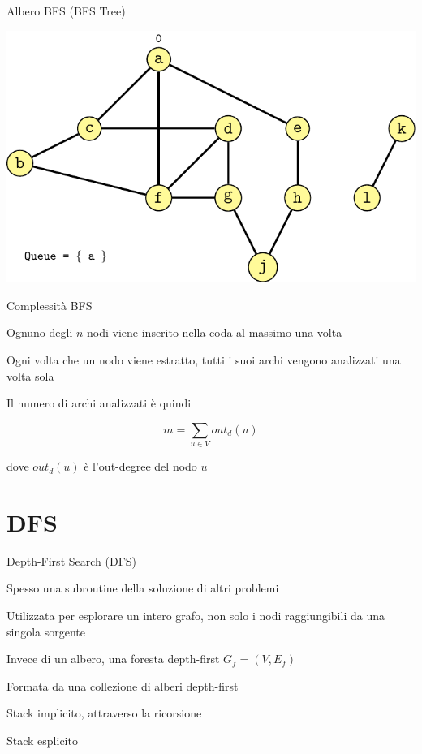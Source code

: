 \begin{frame}{Albero BFS (\alert{BFS Tree})}

\includegraphics[width=1.0\textwidth,page=12]{erd.pdf}

\end{frame}


\begin{frame}{Complessità BFS}

\BIL
\item Ognuno degli $n$ nodi viene inserito nella coda al massimo una volta 
\item Ogni volta che un nodo viene estratto, tutti i suoi archi vengono analizzati una volta
sola
\item Il numero di archi analizzati è quindi 

\[
  m = \sum_{u \in V} \mathit{out}_d(u) 
\]

dove $\mathit{out}_d(u)$ è l'out-degree del nodo $u$
\EIL

\end{frame}

\section{DFS}


\begin{frame}{Depth-First Search (DFS)}

\BI
\item Spesso una subroutine della soluzione di altri problemi
\item Utilizzata per esplorare un intero grafo, non solo i nodi 
raggiungibili da una singola sorgente
\EI

\BI
\item Invece di un albero, una foresta depth-first $G_f = (V, E_f)$
\item Formata da una collezione di alberi depth-first
\EI

\BI
\item Stack implicito, attraverso la ricorsione
\item Stack esplicito
\EI

\end{frame}



